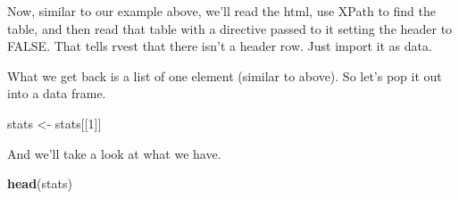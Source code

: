 \documentclass[
]{book}
\newenvironment{Shaded}{\begin{snugshade}}{\end{snugshade}}
\newcommand{\DataTypeTok}[1]{\textcolor[rgb]{0.13,0.29,0.53}{#1}}
\newcommand{\DecValTok}[1]{\textcolor[rgb]{0.00,0.00,0.81}{#1}}
\newcommand{\KeywordTok}[1]{\textcolor[rgb]{0.13,0.29,0.53}{\textbf{#1}}}
\newcommand{\NormalTok}[1]{#1}
\newcommand{\OperatorTok}[1]{\textcolor[rgb]{0.81,0.36,0.00}{\textbf{#1}}}
\newcommand{\OtherTok}[1]{\textcolor[rgb]{0.56,0.35,0.01}{#1}}
\newcommand{\StringTok}[1]{\textcolor[rgb]{0.31,0.60,0.02}{#1}}
\begin{document}
Now, similar to our example above, we'll read the html, use XPath to find the table, and then read that table with a directive passed to it setting the header to FALSE. That tells rvest that there isn't a header row. Just import it as data.

\begin{Shaded}
\end{Shaded}

What we get back is a list of one element (similar to above). So let's pop it out into a data frame.

\begin{Shaded}
\begin{Highlighting}[]
\NormalTok{stats <-}\StringTok{ }\NormalTok{stats[[}\DecValTok{1}\NormalTok{]]}
\end{Highlighting}
\end{Shaded}

And we'll take a look at what we have.

\begin{Shaded}
\begin{Highlighting}[]
\KeywordTok{head}\NormalTok{(stats)}
\end{Highlighting}
\end{Shaded}
\end{document}
